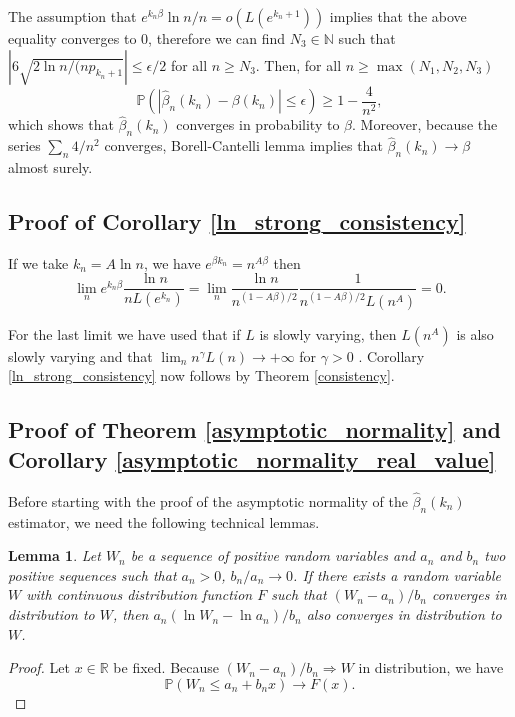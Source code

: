 \documentclass[sn-mathphys-ay]{sn-jnl}%
\newtheorem{lemma}{Lemma}[section]
\newcommand{\N}{\mathbb{N}}
\renewcommand{\P}{\mathbb{P}}
\begin{document}
\begin{appendices}
The assumption that \(e^{k_n\beta}{\ln{n}}/{n}=o(L(e^{k_n+1}))\) implies that the
above equality converges to \(0\), therefore we can find \(N_3\in\N\) such that
\(|6\sqrt{{2\ln{n}}/{(np_{k_n+1}}}|\leq {\epsilon}/{2}\) for all \(n\geq N_3\). Then,
for all \(n\geq\max(N_1,N_2, N_3)\)
\begin{equation*}
    \P\left(\left|\widehat{\beta}_n(k_n)-\beta(k_n)\right|\leq\epsilon\right)\geq 1-\frac{4}{n^2},
\end{equation*}
which shows that \(\widehat\beta_n(k_n)\) converges in probability to \(\beta\).
Moreover, because the series \(\sum_n {4}/{n^2}\) converges, Borell-Cantelli lemma implies
that \(\widehat{\beta}_n(k_n)\to\beta\) almost surely.

\subsection{Proof of Corollary \ref{ln_strong_consistency}}

If we take \(k_n=A\ln{n}\), we have \(e^{\beta k_n}=n^{A\beta}\) then
\begin{equation*}
    \lim_n{e^{k_n\beta}\frac{\ln{n}}{nL(e^{k_n})}} =\lim_n{\frac{\ln{n}}{n^{(1-A\beta)/2}}\frac{1}{n^{(1-A\beta)/2}L(n^A)}}=0.
\end{equation*}

For the last limit we have used that if \(L\) is slowly varying, then \(L(n^A)\) is
also slowly varying and that \(\lim_n n^\gamma L(n)\to +\infty\) for \(\gamma>0\)
\cite[Proposition 1.3.6.v, pp. 16]{Bingham1987}. Corollary
\ref{ln_strong_consistency} now follows by Theorem \ref{consistency}.

\subsection{Proof of Theorem \ref{asymptotic_normality} and Corollary \ref{asymptotic_normality_real_value}}

Before starting with the proof of the asymptotic normality of the
$\widehat{\beta}_n\left({k_n}\right)$ estimator, we need the following technical
lemmas.

\begin{lemma}\label{log_transform_weakly_conv}
    Let \(W_n\) be a sequence of positive random variables and
    \(a_n\) and \(b_n\) two positive sequences such that \(a_n>0\),
    \({b_n}/{a_n}\to 0\). If there exists a random variable \(W\)
    with continuous distribution function \(F\) such that ${({W_n} - {a_n})}/{b_n}$ converges in distribution to $W$,
    then ${a_n} {{{(\ln {W_n} - \ln {a_n})}}/{{{b_n}}}}$ also
    converges in distribution to $W$.
\end{lemma}
\begin{proof}
    Let \(x\in\mathbb{R}\) be fixed. Because \({({W_n} - {a_n})}/{b_n}\Rightarrow  W\) in distribution,
    we have
    \begin{equation*}
        \P\left( {{W_n} \leqslant {a_n} + {b_n}x} \right) \to F\left( x \right).
    \end{equation*}


\end{proof}
\end{appendices}
\end{document}
